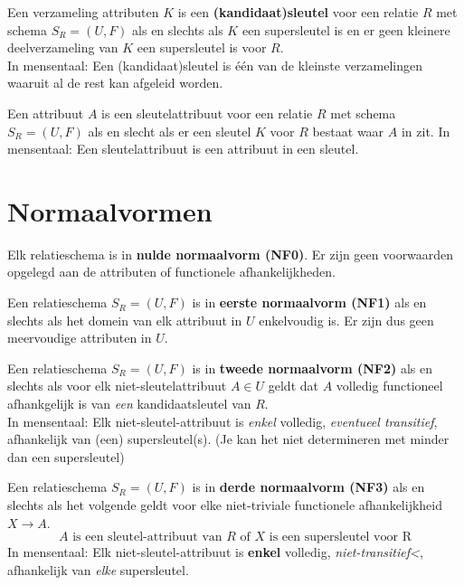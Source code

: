 \documentclass[normaalvormen.tex]{subfiles}
\begin{document}
\begin{de}
Een verzameling attributen $K$ is een \textbf{(kandidaat)sleutel}  voor een relatie $R$ met schema $S_{R} = (U,F)$ als en slechts als $K$ een supersleutel is en er geen kleinere deelverzameling van $K$ een supersleutel is voor $R$.\\
In mensentaal: Een (kandidaat)sleutel is \'e\'en van de kleinste verzamelingen waaruit al de rest kan afgeleid worden.
\end{de}

\begin{de}
Een attribuut $A$ is een sleutelattribuut voor een relatie $R$ met schema $S_{R} = (U,F)$ als en slecht als er een sleutel $K$ voor $R$ bestaat waar $A$ in zit.
In mensentaal: Een sleutelattribuut is een attribuut in een sleutel.
\end{de}

\section{Normaalvormen}
\begin{de}
Elk relatieschema is in \textbf{nulde normaalvorm (NF0)}. Er zijn geen voorwaarden opgelegd aan de attributen of functionele afhankelijkheden.
\end{de}

\begin{de}
Een relatieschema $S_{R} = (U,F)$ is in \textbf{eerste normaalvorm (NF1)} als en slechts als het domein van elk attribuut in $U$ enkelvoudig is. Er zijn dus geen meervoudige attributen in $U$.
\end{de}

\begin{de}
Een relatieschema $S_{R} = (U,F)$ is in \textbf{tweede normaalvorm (NF2)} als en slechts als voor elk niet-sleutelattribuut $A \in U$ geldt dat $A$ volledig functioneel afhankgelijk is van \emph{een} kandidaatsleutel van $R$.\\
In mensentaal: Elk niet-sleutel-attribuut is \emph{enkel} volledig, \emph{eventueel transitief}, afhankelijk van (een) supersleutel(s). (Je kan het niet determineren met minder dan een supersleutel)
\end{de}

\begin{de}
Een relatieschema $S_{R} = (U,F)$ is in \textbf{derde normaalvorm (NF3)} als en slechts als het volgende geldt voor elke niet-triviale functionele afhankelijkheid $X\rightarrow A$.
\[
A \text{ is een sleutel-attribuut van } R \text{ of } X \text{ is een supersleutel voor R}
\]
In mensentaal: Elk niet-sleutel-attribuut is \textbf{enkel} volledig, \emph{niet-transitief<}, afhankelijk van \emph{elke} supersleutel.
\end{de}
\end{document}
